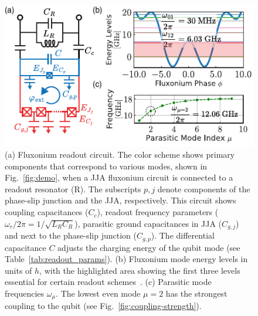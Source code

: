 \documentclass[%
reprint,
superscriptaddress,
 amsmath,amssymb,
 aps,
 prx,
longbibliography,
floatfix,
]{revtex4-2}
\begin{document}
\begin{figure}[htb]
\centering    
\includegraphics[width=\linewidth]{Figures/Meas_Circuit.pdf}
\caption{(a) Fluxonium readout circuit. The color scheme shows primary components that correspond to various modes, shown in Fig.~\ref{fig:demo}, when a JJA fluxonium circuit is connected to a readout resonator (R). The subscripts $p,j$ denote components of the phase-slip junction and the JJA, respectively. This circuit shows coupling capacitances ($C_c$), readout frequency parameters ($\omega_r/2\pi=1/\sqrt{L_{R}C_{R}}$), parasitic ground capacitances in JJA ($C_{g,j}$) and next to the phase-slip junction ($C_{g,p}$). The differential capacitance $C$ adjusts the charging energy of the qubit mode (see Table~\ref{tab:readout_params}). (b) Fluxonium mode energy levels in units of $h$, with the highlighted area showing the first three levels essential for certain readout schemes~\cite{zhang_universal_2021}. (c) Parasitic mode frequencies $\omega_\mu$. The lowest even mode $\mu = 2$ has the strongest coupling to the qubit (see Fig.~\ref{fig:coupling-strength}). 
}
\label{fig:meas_circuit}
\end{figure}
\renewcommand{\arraystretch}{1.5} %
\end{document}
